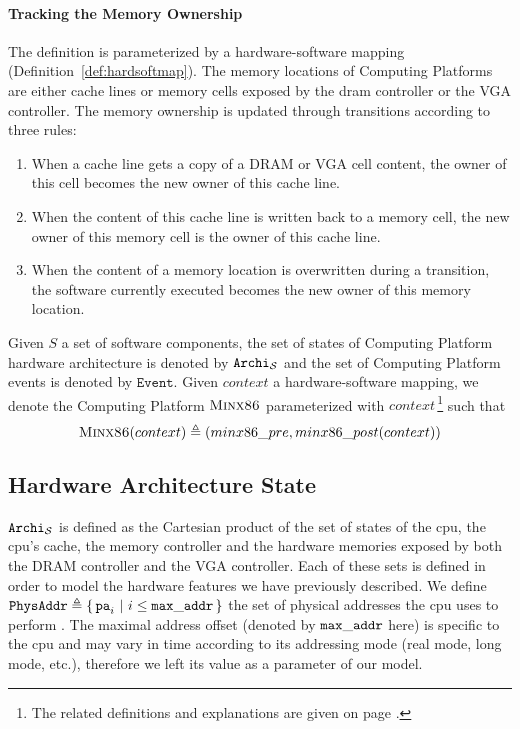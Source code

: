 \paragraph{Tracking the Memory Ownership}
%
The  definition is parameterized by a hardware-software
mapping (Definition~\ref{def:hardsoftmap}).
%
The memory locations of  Computing Platforms are either cache
lines or memory cells exposed by the \ac{dram} controller or the VGA controller.
%
The memory ownership is updated through transitions according to three rules:
%
\begin{enumerate}
\item When a cache line gets a copy of a DRAM or VGA cell content, the owner of
  this cell becomes the new owner of this cache line.
%
\item When the content of this cache line is written back to a memory cell, the
  new owner of this memory cell is the owner of this cache line.
%
\item When the content of a memory location is overwritten during a transition,
  the software currently executed becomes the new owner of this memory location.
%
\end{enumerate}

Given $S$ a set of software components, the set of states of 
Computing Platform hardware architecture is denoted by
$\texttt{Archi}_{\mathcal{S}}$ and the set of  Computing Platform
events is denoted by $\texttt{Event}$.
%
Given $context$ a hardware-software mapping, we denote the Computing Platform
$\textsc{Minx86}$ parameterized with $context$\,\footnote{The related
  definitions and explanations are given on page \pageref{page:minx86def}.} such
that
%
\[
  \textsc{Minx86}(context) \triangleq (minx86\_pre, minx86\_post(context))
\]

\subsection{Hardware Architecture State}

$\texttt{Archi}_{\mathcal{S}}$ is defined as the Cartesian product of the set of
states of the \ac{cpu}, the \ac{cpu}'s cache, the memory controller and the
hardware memories exposed by both the DRAM controller and the VGA controller.
%
Each of these sets is defined in order to model the hardware features we have
previously described.
%
We define
$\texttt{PhysAddr} \triangleq \{\,\mathtt{pa}_i\ |\ i \leq \mathtt{max\_addr}\,\}$ the
set of physical addresses the \ac{cpu} uses to perform \IO.
%
The maximal address offset (denoted by $\mathtt{max\_addr}$ here) is specific to
the \ac{cpu} and may vary in time according to its addressing mode (real mode,
long mode, etc.), therefore we left its value as a parameter of our model.

